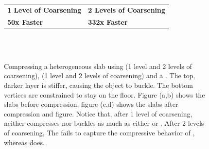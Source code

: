 \begin{figure}[t]
	\centering
	\begin{tabularx}{0.92\columnwidth}{ Y Y }
		\textbf{1 Level of Coarsening} & \textbf{\textbf{2 Levels of Coarsening}} \\
		\textbf{50x Faster} & \textbf{332x Faster}
	\end{tabularx}\\
	\\
	\vspace{-2pt}
	\caption{Compressing a heterogeneous slab using {\Naive} (1 level and 2 levels of coarsening), {\DDFEM} (1 level and 2 levels of coarsening) and a {\HiRes}. The top, darker layer is stiffer, causing the object to buckle. The bottom vertices are constrained to stay on the floor. Figure (a,b) shows the slabs before compression, figure (c,d) shows the slabs after compression and figure. Notice that, after 1 level of coarsening, {\Naive} neither compresses nor buckles as much as either {\DDFEM} or {\HiRes}. After 2 levels of coarsening, 
		The {\Naive} fails to capture the compressive behavior of {\HiRes}, whereas {\DDFEM} does.}
	\label{fig:buckling}
\end{figure}
